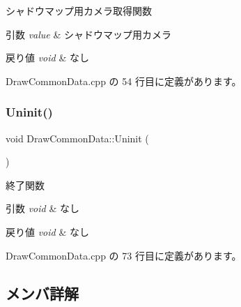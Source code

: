 シャドウマップ用カメラ取得関数 


\begin{DoxyParams}{引数}
{\em value} & シャドウマップ用カメラ \\
\hline
\end{DoxyParams}

\begin{DoxyRetVals}{戻り値}
{\em void} & なし \\
\hline
\end{DoxyRetVals}


 Draw\+Common\+Data.\+cpp の 54 行目に定義があります。

\mbox{\label{class_draw_common_data_af19ce43b8e3eb24da78a8fa7d98d4315}} 
\subsubsection{\texorpdfstring{Uninit()}{Uninit()}}
{\footnotesize\ttfamily void Draw\+Common\+Data\+::\+Uninit (\begin{DoxyParamCaption}{ }\end{DoxyParamCaption})}



終了関数 


\begin{DoxyParams}{引数}
{\em void} & なし \\
\hline
\end{DoxyParams}

\begin{DoxyRetVals}{戻り値}
{\em void} & なし \\
\hline
\end{DoxyRetVals}


 Draw\+Common\+Data.\+cpp の 73 行目に定義があります。



\subsection{メンバ詳解}
\mbox{\label{class_draw_common_data_a368fe7654d88cd5123429bd6a3f88d09}} 
